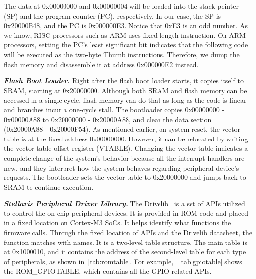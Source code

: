 The data at 0x00000000 and 0x00000004 will be loaded into the stack pointer (SP) and the program counter (PC), respectively. In our case, the SP is 0x20000B48, and the PC is 0x000000E3. Notice that 0xE3 is an odd number. As we know, RISC processors such as ARM uses fixed-length instruction. On ARM processors, setting the PC's least significant bit indicates that the following code will be executed as the two-byte Thumb instructions. Therefore, we dump the flash memory and disassemble it at address 0x000000E2 instead.



\textbf{\textit{Flash Boot Loader.}} Right after the flash boot loader starts, it copies itself to SRAM, starting at 0x20000000. Although both SRAM and flash memory can be accessed in a single cycle, flash memory can do that as long as the code is linear and branches incur a one-cycle stall. The bootloader copies 0x00000000 - 0x00000A88 to 0x20000000 - 0x20000A88, and clear the data section (0x20000A88 - 0x20000F54). As mentioned earlier, on system reset, the vector table is at the fixed address 0x00000000. However, it can be relocated by writing the vector table offset register (VTABLE). Changing the vector table indicates a complete change of the system's behavior because all the interrupt handlers are new, and they interpret how the system behaves regarding peripheral device's requests. The bootloader sets the vector table to 0x20000000 and jumps back to SRAM to continue execution.


\textbf{\textit{Stellaris Peripheral Driver Library.}} The Drivelib~\cite{lm3s2793rom} is a set of APIs utilized to control the on-chip peripheral devices. It is provided in ROM code and placed in a fixed location on Cortex-M3 SoCs. It helps identify what functions the firmware calls. Through the fixed location of APIs and the Drivelib datasheet, the function matches with names. It is a two-level table structure. The main table is at 0x1000010, and it contains the address of the second-level table for each type of peripherals, as shown in~\autoref{tab:romtable}. For example, ~\autoref{tab:gpiotable} shows the ROM\_GPIOTABLE, which contains all the GPIO related APIs.


